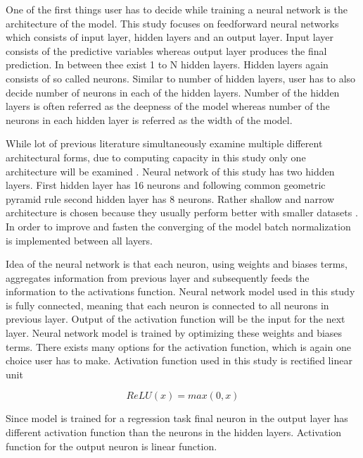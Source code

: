 \documentclass[12pt]{article}
\begin{document}
One of the first things user has to decide while training a neural network is the architecture of the model. This study focuses on feedforward neural networks which consists of input layer, hidden layers and an output layer. Input layer consists of the predictive variables whereas output layer produces the final prediction. In between thee exist 1 to N hidden layers. Hidden layers again consists of  so called neurons. Similar to number of hidden layers, user has to also decide number of neurons in each of the hidden layers. Number of the hidden layers is often referred as the deepness of the model whereas number of the neurons in each hidden layer is referred as the width of the model. \par

While lot of previous literature simultaneously examine multiple different architectural forms, due to computing capacity in this study only one architecture will be examined \citep{guetal, HANAUER2023, TOBEK2021100588}. Neural network of this study has two hidden layers. First hidden layer has 16 neurons and following common geometric pyramid rule second hidden layer has 8 neurons. Rather shallow and narrow architecture is chosen because they usually perform better with smaller datasets \citep{guetal}. In order to improve and fasten the converging of the model batch normalization is implemented between all layers. \par

Idea of the neural network is that each neuron, using weights and biases terms, aggregates information from previous layer and subsequently feeds the information to the activations function. Neural network model used in this study is fully connected, meaning that each neuron is connected to all neurons in previous layer. Output of the activation function will be the input for the next layer. Neural network model is trained by optimizing these weights and biases terms. There exists many options for the activation function, which is again one choice user has to make. Activation function used in this study is rectified linear unit \par

\begin{equation}
\label{ReLU}
ReLU(x) = max(0, x)
\end{equation}

Since model is trained for a regression task final neuron in the output layer has different activation function than the neurons in the hidden layers. Activation function for the output neuron is linear function. \par
\end{document}
